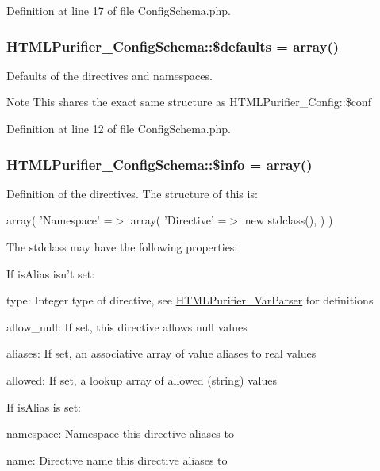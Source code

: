Definition at line 17 of file Config\+Schema.\+php.

\hypertarget{classHTMLPurifier__ConfigSchema_a7fc713e221224772229688e8bda11a19}{
\subsubsection[{\$defaults}]{\setlength{\rightskip}{0pt plus 5cm}H\+T\+M\+L\+Purifier\+\_\+\+Config\+Schema\+::\$defaults = array()}}\label{classHTMLPurifier__ConfigSchema_a7fc713e221224772229688e8bda11a19}
Defaults of the directives and namespaces. \begin{DoxyNote}{Note}
This shares the exact same structure as H\+T\+M\+L\+Purifier\+\_\+\+Config\+::\$conf 
\end{DoxyNote}


Definition at line 12 of file Config\+Schema.\+php.

\hypertarget{classHTMLPurifier__ConfigSchema_a2e8a80a7aa2d777b95de55e8465d385b}{
\subsubsection[{\$info}]{\setlength{\rightskip}{0pt plus 5cm}H\+T\+M\+L\+Purifier\+\_\+\+Config\+Schema\+::\$info = array()}}\label{classHTMLPurifier__ConfigSchema_a2e8a80a7aa2d777b95de55e8465d385b}
Definition of the directives. The structure of this is\+:

array( 'Namespace' =$>$ array( 'Directive' =$>$ new stdclass(), ) )

The stdclass may have the following properties\+:


\begin{DoxyItemize}
\item If is\+Alias isn't set\+:
\begin{DoxyItemize}
\item type\+: Integer type of directive, see \hyperlink{classHTMLPurifier__VarParser}{H\+T\+M\+L\+Purifier\+\_\+\+Var\+Parser} for definitions
\item allow\+\_\+null\+: If set, this directive allows null values
\item aliases\+: If set, an associative array of value aliases to real values
\item allowed\+: If set, a lookup array of allowed (string) values
\end{DoxyItemize}
\item If is\+Alias is set\+:
\begin{DoxyItemize}
\item namespace\+: Namespace this directive aliases to
\item name\+: Directive name this directive aliases to
\end{DoxyItemize}
\end{DoxyItemize}

